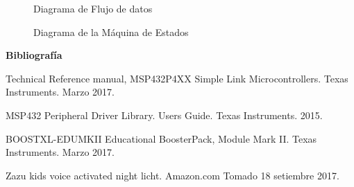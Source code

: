 \begin{figure}
  \centering
\scalebox{.4}{}
\caption{Diagrama de Flujo de datos}
\label{fig:data_flow}
\end{figure}



\begin{figure}
\centering
\scalebox{.4}{}
\caption{Diagrama de la Máquina de Estados}
\label{fig:state_machine}
\end{figure}

\textbf{ Bibliografía}

Technical Reference manual, MSP432P4XX Simple Link Microcontrollers. Texas Instruments. Marzo 2017.

MSP432 Peripheral Driver Library. Users Guide. Texas Instruments. 2015.

BOOSTXL-EDUMKII Educational BoosterPack, Module Mark II. Texas Instruments. Marzo 2017.

Zazu kids voice activated night licht. Amazon.com Tomado 18 setiembre 2017.

%
%
